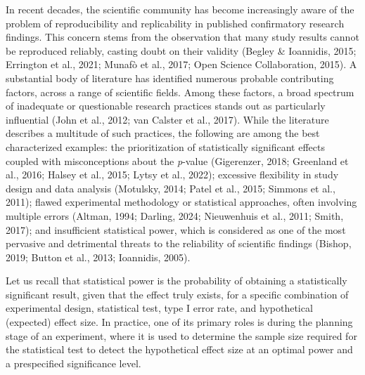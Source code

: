 \documentclass[authordate, meta]{jote-new-article}
\begin{document}
	In recent decades, the scientific community has become increasingly aware of the problem of reproducibility and replicability in published confirmatory research findings. This concern stems from the observation that many study results cannot be reproduced reliably, casting doubt on their validity (Begley \& Ioannidis, 2015; Errington et al., 2021; Munafò et al., 2017; Open Science Collaboration, 2015). A substantial body of literature has identified numerous probable contributing factors, across a range of scientific fields. Among these factors, a broad spectrum of inadequate or questionable research practices stands out as particularly influential (John et al., 2012; van Calster et al., 2017). While the literature describes a multitude of such practices, the following are among the best characterized examples: the prioritization of statistically significant effects coupled with misconceptions about the \emph{p}-value (Gigerenzer, 2018; Greenland et al., 2016; Halsey et al., 2015; Lytsy et al., 2022); excessive flexibility in study design and data analysis (Motulsky, 2014; Patel et al., 2015; Simmons et al., 2011); flawed experimental methodology or statistical approaches, often involving multiple errors (Altman, 1994; Darling, 2024; Nieuwenhuis et al., 2011; Smith, 2017); and insufficient statistical power, which is considered as one of the most pervasive and detrimental threats to the reliability of scientific findings (Bishop, 2019; Button et al., 2013; Ioannidis, 2005).



	Let us recall that statistical power is the probability of obtaining a statistically significant result, given that the effect truly exists, for a specific combination of experimental design, statistical test, type I error rate, and hypothetical (expected) effect size. In practice, one of its primary roles is during the planning stage of an experiment, where it is used to determine the sample size required for the statistical test to detect the hypothetical effect size at an optimal power and a prespecified significance level.
\end{document}
